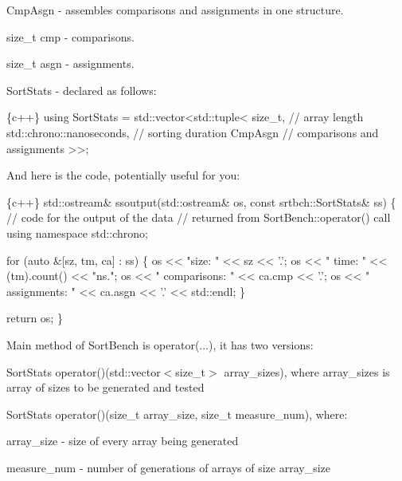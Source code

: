 \begin{DoxyItemize}
\item {\ttfamily Cmp\+Asgn} -\/ assembles comparisons and assignments in one structure.
\begin{DoxyItemize}
\item {\ttfamily size\+\_\+t cmp} -\/ comparisons.
\item {\ttfamily size\+\_\+t asgn} -\/ assignments.
\end{DoxyItemize}
\item {\ttfamily Sort\+Stats} -\/ declared as follows\+: 
\begin{DoxyCode}
\{c++\}
using SortStats = std::vector<std::tuple<
                  size\_t,                     // array length
                  std::chrono::nanoseconds,   // sorting duration
                  CmpAsgn                     // comparisons and assignments
                  >>;
\end{DoxyCode}
 And here is the code, potentially useful for you\+: 
\begin{DoxyCode}
\{c++\}
std::ostream& ssoutput(std::ostream& os, const srtbch::SortStats& ss)
\{
        // code for the output of the data
        // returned from SortBench::operator() call
        using namespace std::chrono;

        for (auto &[sz, tm, ca] : ss)
        \{
                os << "size: " << sz << '.';
                os << " time: " << (tm).count() << "ns.";
                os << " comparisons: " << ca.cmp << '.';
                os << " assignments: " << ca.asgn << '.' << std::endl;
        \}

        return os;
\}
\end{DoxyCode}

\end{DoxyItemize}

Main method of {\ttfamily Sort\+Bench} is {\ttfamily operator(...)}, it has two versions\+:
\begin{DoxyItemize}
\item {\ttfamily Sort\+Stats operator()(std\+::vector$<$size\+\_\+t$>$ array\+\_\+sizes)}, where {\ttfamily array\+\_\+sizes} is array of sizes to be generated and tested
\item {\ttfamily Sort\+Stats operator()(size\+\_\+t array\+\_\+size, size\+\_\+t measure\+\_\+num)}, where\+:
\begin{DoxyItemize}
\item {\ttfamily array\+\_\+size} -\/ size of every array being generated
\item {\ttfamily measure\+\_\+num} -\/ number of generations of arrays of size {\ttfamily array\+\_\+size}
\end{DoxyItemize}
\end{DoxyItemize}

